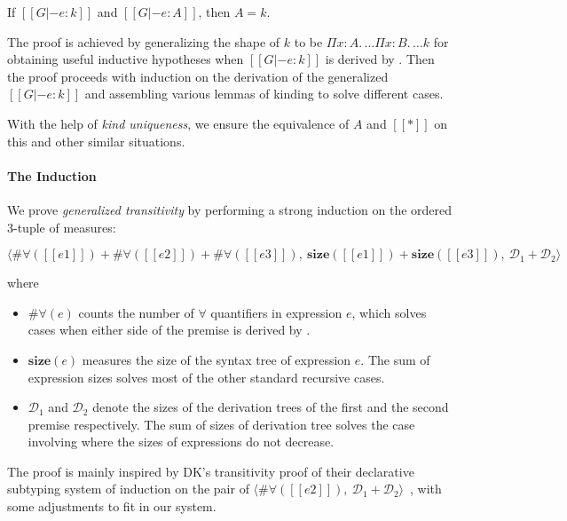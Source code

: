 \begin{theorem}
    If $[[G |- e : k]]$ and $[[G |- e : A]]$,
    then $A = k$.
\end{theorem}

\noindent The proof is achieved by generalizing the shape of $k$ to be
$\Pi x : A.\, \dots \Pi x : B.\, \dots k$ for obtaining useful inductive hypotheses
when $[[G |- e : k]]$ is derived by . Then the proof
proceeds with induction on the derivation of the generalized $[[G |- e : k]]$ and
assembling various lemmas of kinding to solve different cases.

With the help of \emph{kind uniqueness},
we ensure the equivalence of $A$ and $[[*]]$ on this and other similar situations.

\paragraph{The Induction}

We prove \emph{generalized transitivity} by performing a strong induction on
the ordered 3-tuple of measures:

$$
\langle \#\forall([[e1]]) + \#\forall([[e2]]) + \#\forall([[e3]]), ~
\mathbf{size}([[e1]]) + \mathbf{size}([[e3]]), ~
\mathcal{D}_1 + \mathcal{D}_2 \rangle
$$

\noindent where

\begin{itemize}
    \item $\#\forall(e)$ counts the number of $\forall$ quantifiers
    in expression $e$, which solves cases when either side of the premise is
    derived by .
    \item $\mathbf{size}(e)$ measures the size of the syntax tree of
    expression $e$. The sum of expression sizes solves most of the other
    standard recursive cases.
    \item $\mathcal{D}_1$ and $\mathcal{D}_2$ denote the sizes of the derivation
    trees of the first and the second premise respectively. The sum of sizes
    of derivation tree solves the case involving  where the sizes of
    expressions do not decrease.
\end{itemize}

The proof is mainly inspired by DK's transitivity proof of their declarative subtyping
system of induction on the pair of
$\langle \#\forall([[e2]]) ,~ \mathcal{D}_1 + \mathcal{D}_2 \rangle$~\citep{dunfield2013lemmas},
with some adjustments to fit in our system.


